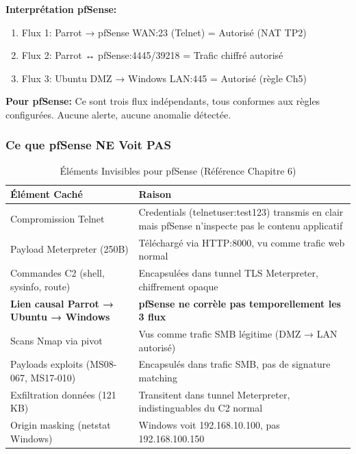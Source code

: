 \documentclass[12pt,a4paper,openany]{report}
\newcommand{\tableheadcolor}{\rowcolor{tableheadbg}}
\begin{document}
	\textbf{Interprétation pfSense:}
	\begin{enumerate}
		\item Flux 1: Parrot → pfSense WAN:23 (Telnet) = Autorisé (NAT TP2)
		\item Flux 2: Parrot ↔ pfSense:4445/39218 = Trafic chiffré autorisé
		\item Flux 3: Ubuntu DMZ → Windows LAN:445 = Autorisé (règle Ch5)
	\end{enumerate}
	
	\textbf{Pour pfSense:} Ce sont trois flux indépendants, tous conformes 
	aux règles configurées. Aucune alerte, aucune anomalie détectée.
	
	\subsubsection{Ce que pfSense NE Voit PAS}
	
	\begin{table}[H]
		\centering
		\small
		\renewcommand{\arraystretch}{1.4}
		\setlength{\arrayrulewidth}{0.5pt}
		\begin{tabular}{p{5.5cm} p{7.5cm}}
			\arrayrulecolor{tableborder}
			\hline
			\tableheadcolor
			\textcolor{tableheadfg}{\textbf{Élément Caché}} &
			\textcolor{tableheadfg}{\textbf{Raison}} \\
			\hline
			\rowcolor{tablerowalt}
			Compromission Telnet & 
			Credentials (telnetuser:test123) transmis en clair mais pfSense 
			n'inspecte pas le contenu applicatif \\
			
			Payload Meterpreter (250B) & 
			Téléchargé via HTTP:8000, vu comme trafic web normal \\
			
			\rowcolor{tablerowalt}
			Commandes C2 (shell, sysinfo, route) & 
			Encapsulées dans tunnel TLS Meterpreter, chiffrement opaque \\
			
			\textbf{Lien causal Parrot → Ubuntu → Windows} & 
			\textbf{pfSense ne corrèle pas temporellement les 3 flux} \\
			
			\rowcolor{tablerowalt}
			Scans Nmap via pivot & 
			Vus comme trafic SMB légitime (DMZ → LAN autorisé) \\
			
			Payloads exploits (MS08-067, MS17-010) & 
			Encapsulés dans trafic SMB, pas de signature matching \\
			
			\rowcolor{tablerowalt}
			Exfiltration données (121 KB) & 
			Transitent dans tunnel Meterpreter, indistinguables du C2 normal \\
			
			Origin masking (netstat Windows) & 
			Windows voit 192.168.10.100, pas 192.168.100.150 \\
			\hline
		\end{tabular}
		\caption{Éléments Invisibles pour pfSense (Référence Chapitre 6)}
	\end{table}
	
\end{document}
